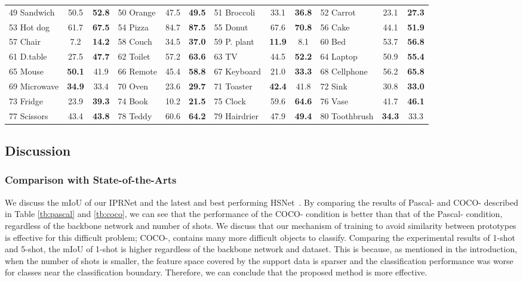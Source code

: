 \documentclass[runningheads]{llncs}
\begin{document}
\begin{table}[htb]
{\begin{tabular}{lcc|lcc|lcc|lcc}
49 Sandwich& 50.5 & \textbf{52.8} &50 Orange& 47.5 & \textbf{49.5} &51 Broccoli& 33.1 & \textbf{36.8} &52 Carrot& 23.1 & \textbf{27.3} \\
53 Hot dog& 61.7 & \textbf{67.5} &54 Pizza& 84.7 & \textbf{87.5} &55 Donut& 67.6 & \textbf{70.8} &56 Cake& 44.1 & \textbf{51.9} \\
57 Chair& 7.2 & \textbf{14.2} &58 Couch& 34.5 & \textbf{37.0} &59 P. plant& \textbf{11.9} & 8.1 &60 Bed& 53.7 & \textbf{56.8} \\
61 D.table& 27.5 & \textbf{47.7} &62 Toilet& 57.2 & \textbf{63.6} &63 TV& 44.5 & \textbf{52.2} &64 Laptop& 50.9 & \textbf{55.4} \\
65 Mouse& \textbf{50.1} & 41.9 &66 Remote& 45.4 & \textbf{58.8} &67 Keyboard& 21.0 & \textbf{33.3} &68 Cellphone& 56.2 & \textbf{65.8} \\
69 Microwave& \textbf{34.9} & 33.4 &70 Oven& 23.6 & \textbf{29.7} &71 Toaster& \textbf{42.4} & 41.8 &72 Sink& 30.8 & \textbf{33.0} \\
73 Fridge& 23.9 & \textbf{39.3} &74 Book& 10.2 & \textbf{21.5} &75 Clock& 59.6 & \textbf{64.6} &76 Vase& 41.7 & \textbf{46.1} \\
77 Scissors& 43.4 & \textbf{43.8} &78 Teddy& 60.6 & \textbf{64.2} &79 Hairdrier& 47.9 & \textbf{49.4} &80 Toothbrush& \textbf{34.3} & 33.3 
\\ \hline \end{tabular}
  }
\end{table}
\subsection{Discussion}
\subsubsection{Comparison with State-of-the-Arts}
We discuss the mIoU of our IPRNet and the latest and best performing HSNet~\cite{HSNet}.
By comparing the results of Pascal- and COCO- described in Table \ref{tb:pascal} and \ref{tb:coco}, we can see that the performance of the COCO- condition is better than that of the Pascal- condition, regardless of the backbone network and number of shots.
We discuss that our mechanism of training to avoid similarity between prototypes is effective for this difficult problem; COCO-, contains many more difficult objects to classify.
Comparing the experimental results of 1-shot and 5-shot, the mIoU of 1-shot is higher regardless of the backbone network and dataset.
This is because, as mentioned in the introduction, when the number of shots is smaller, the feature space covered by the support data is sparser and the classification performance was worse for classes near the classification boundary. Therefore, we can conclude that the proposed method is more effective.
\end{document}
